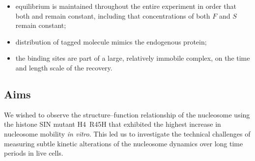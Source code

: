     \begin{itemize}
      \item equilibrium is maintained throughout the entire experiment in
            order that both \Kon{} and \Koff{} remain constant,
            including that concentrations of both $F$ and $S$ remain constant;
      \item distribution of tagged molecule mimics the endogenous protein;
      \item the binding sites are part of a large, relatively immobile complex,
            on the time and length scale of the recovery.
    \end{itemize}

  \subsection{Aims}

    We wished to observe the structure--function relationship of the nucleosome
    using the histone SIN mutant H4~R45H that exhibited the
    highest increase in nucleosome mobility \textit{in vitro}.
    This led us to investigate the technical challenges of measuring subtle kinetic
    alterations of the nucleosome dynamics over long time periods in live cells.

